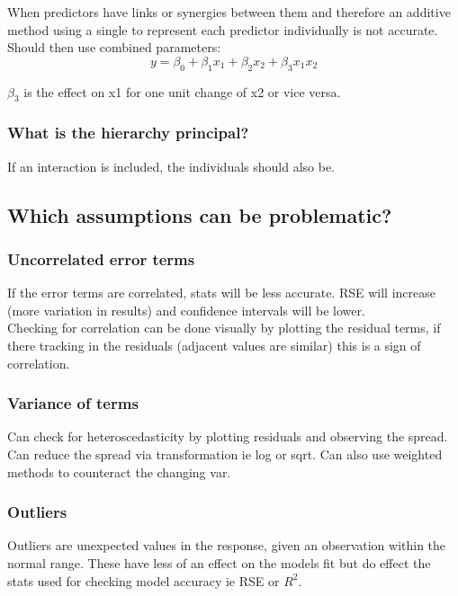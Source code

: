 \documentclass[11pt]{scrartcl} %
\begin{document}
When predictors have links or synergies between them and therefore an additive method using a single
to represent each predictor individually is not accurate.\\

Should then use combined parameters:
\begin{equation}
	y = \beta_0 + \beta_1x_1 + \beta_2x_2 + \beta_3x_1x_2
\end{equation}

\(\beta_3\) is the effect on x1 for one unit change of x2 or vice versa.

\subsubsection{What is the hierarchy principal?}

If an interaction is included, the individuals should also be.

\subsection{Which assumptions can be problematic?}

\subsubsection{Uncorrelated error terms}

If the error terms are correlated, stats will be less accurate. RSE will increase (more variation in results)
and confidence intervals will be lower.\\

Checking for correlation can be done visually by plotting the residual terms, if there tracking in the residuals
(adjacent values are similar) this is a sign of correlation.

\subsubsection{Variance of terms}

Can check for heteroscedasticity by plotting residuals and observing the spread. Can reduce the spread
via transformation ie log or sqrt. Can also use weighted methods to counteract the changing var.

\subsubsection{Outliers}

Outliers are unexpected values in the response, given an observation within the normal range. These have less
of an effect on the models fit but do effect the stats used for checking model accuracy ie RSE or \(R^2\).
\end{document}
